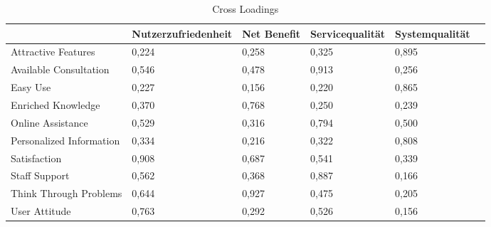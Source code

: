 \begin{table}[h] 
\footnotesize
\caption{Cross Loadings}
\label{tab:Cross-Loadings} 
\begin{tabular}{@{}llllll@{}} \toprule

 & \textbf{Nutzerzufriedenheit} & \textbf{Net Benefit} & \textbf{Servicequalität} & \textbf{Systemqualität} \\ \midrule

Attractive Features 		& 0,224 		& 0,258	& 0,325	& 0,895 		\\
 
Available Consultation 		& 0,546 		& 0,478 	& 0,913	& 0,256		\\

Easy Use 					& 0,227 		& 0,156 	& 0,220	& 0,865		\\

Enriched Knowledge 			& 0,370 		& 0,768 	& 0,250 	& 0,239		\\ 
 
Online Assistance 			& 0,529 		& 0,316	& 0,794 	& 0,500 		\\
 
Personalized Information 	& 0,334 		& 0,216 	& 0,322	& 0,808		\\

Satisfaction 				& 0,908 		& 0,687 	& 0,541	& 0,339		\\

Staff Support 				& 0,562 		& 0,368 	& 0,887 	& 0,166		\\ 
 
Think Through Problems 		& 0,644 		& 0,927 	& 0,475	& 0,205		\\

User Attitude				& 0,763 		& 0,292 	& 0,526	& 0,156		\\
 
 \bottomrule
 
\end{tabular}	
\end{table}










